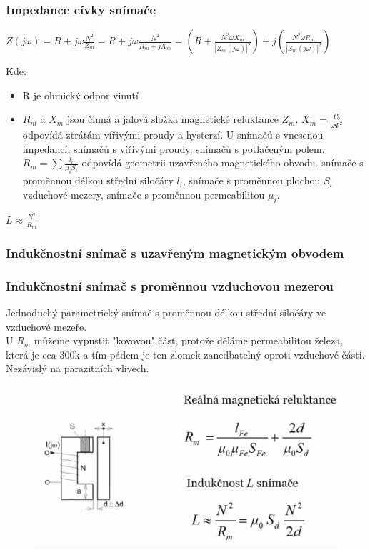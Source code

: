 \subsubsection{Impedance cívky snímače}
\begin{center}
    \(Z(j\omega) = R + j\omega\frac{N^2}{Z_m} = R +j\omega\frac{N^2}{R_m+jX_m} = (R+ \frac{N^2\omega X_m}{\left\lvert Z_m(j\omega)\right\rvert^2 }) + j(\frac{N^2\omega R_m}{\left\lvert Z_m(j\omega) \right\rvert^2})\)
\end{center}
Kde:
\begin{itemize}
    \item R je ohmický odpor vinutí
    \item \(R_m\) a \(X_m\) jsou činná a jalová složka magnetické reluktance \(Z_m\). \(X_m = \frac{P_0}{\omega \Phi^2}\) odpovídá ztrátám vířivými proudy a hysterzí. U snímačů s vnesenou impedancí, snímačů s vířivými proudy, snímačů s potlačeným polem. \(R_m = \sum \frac{l_i}{\mu_i S_i}\) odpovídá geometrii uzavřeného magnetického obvodu. snímače s proměnnou délkou střední siločáry \(l_i\), snímače s proměnnou plochou \(S_i\) vzduchové mezery, snímače s proměnnou permeabilitou \(\mu_i\).
\end{itemize}
\begin{center}
    \(L \approx \frac{N^2}{R_m}\)
\end{center}
\subsubsection{Indukčnostní snímač s uzavřeným magnetickým obvodem}
\subsubsection*{Indukčnostní snímač s proměnnou vzduchovou mezerou}
Jednoduchý parametrický snímač s proměnnou délkou střední siločáry ve vzduchové mezeře.\\
U \(R_m\) můžeme vypustit "kovovou" část, protože děláme permeabilitou železa, která je cca 300k a tím pádem je ten zlomek zanedbatelný oproti vzduchové části.\\
Nezávislý na parazitních vlivech.\\
\newpage
\begin{figure}[h!]
    \centering
    \includegraphics[scale = 0.3]{img/IndukcSPromMez.png}
\end{figure}

